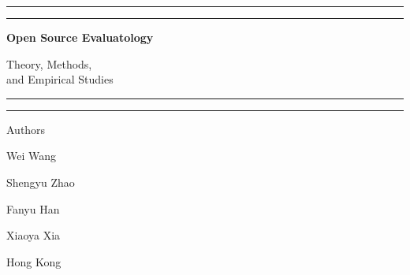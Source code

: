 \clearpage\thispagestyle{empty}
\vspace*{20mm}
\begin{center}
{\color{HeadingInk}\rule{\textwidth}{.8pt}}\par\vspace{2mm}
{\color{FrameworkRule}\rule{\textwidth}{.35pt}}\par\vspace{9mm}
{\bfseries\fontsize{28}{33}\selectfont\color{HeadingInk}Open Source Evaluatology\par}
\vspace{4mm}
{\fontsize{17}{23}\selectfont Theory, Methods,\\and Empirical Studies\par}
\vspace{9mm}
{\color{FrameworkRule}\rule{\textwidth}{.35pt}}\par\vspace{2mm}
{\color{HeadingInk}\rule{\textwidth}{.8pt}}\par
\vspace{18mm}
{\fontsize{15}{18}\selectfont Authors\par}
\vspace{6mm}
{\fontsize{14}{22}\selectfont
Wei Wang\par Shengyu Zhao\par Fanyu Han\par Xiaoya Xia\par}
\vfill
{\fontsize{13}{18}\selectfont\BookPublisher\par Hong Kong\par\BookDate\par}
\vspace*{31mm}
\end{center}\clearpage

